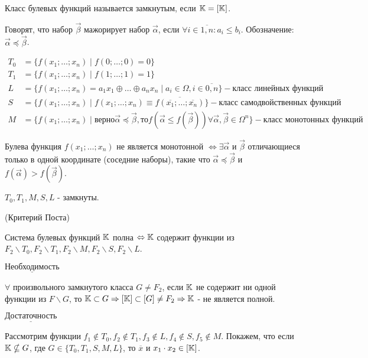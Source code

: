\opr Класс булевых функций называется замкнутым, если $\mathbb{K} = [\mathbb{K}]$.

Говорят, что набор $\vec{\beta}$ мажорирует набор $\vec{\alpha}$, если $\forall i \in \overline{1, n}: a_i \leq b_i$. Обозначение: $\vec{\alpha} \preccurlyeq \vec{\beta}$.

\examplei
\begin{align*}
    T_0 &= \{f(x_1; \dots; x_n) \mid f(0; \dots; 0) = 0\}\\
    T_1 &= \{f(x_1; \dots; x_n) \mid f(1; \dots; 1) = 1\}\\
    L   &= \{f(x_1; \dots; x_n) = a_1x_1 \oplus \ldots \oplus a_nx_n \mid a_i \in \Omega, i \in \overline{0, n}\} - \text{класс линейных функций}\\
    S   &= \{f(x_1; \dots; x_n) \mid f(x_1; \dots; x_n) \equiv \overline{f(\overline{x_1}; \dots; \overline{x_n})} \} - \text{класс самодвойственных функций} \\
    M   &= \{f(x_1; \dots; x_n) \mid \text{верно} \vec{\alpha} \preccurlyeq \vec{\beta}, \text{то} f(\vec{\alpha} \leq f(\vec{\beta})) \forall \vec{\alpha}, \vec{\beta} \in \Omega^n\} - \text{класс монотонных функций}
\end{align*}

\lem Булева функция $f(x_1; \dots; x_n)$ не является монотонной $\Leftrightarrow \exists \vec{\alpha}$ и $\vec{\beta}$ отличающиеся
только в одной координате (соседние наборы), такие что $\vec{\alpha} \preccurlyeq \vec{\beta}$ и $f(\vec{\alpha}) > f(\vec{\beta})$.

\thr $T_0, T_1, M, S, L$ - замкнуты.

\thr (Критерий Поста)

Система булевых функций $\mathbb{K}$ полна $\Leftrightarrow \mathbb{K}$ содержит функции из $F_2 \backslash T_0, F_2 \backslash T_1, F_2 \backslash M, F_2 \backslash S, F_2 \backslash L$.

\proof 

    $\underline{\text{Необходимость}}$

    $\forall$ произвольного замкнутого класса $G \neq F_2$, если $\mathbb{K}$ не содержит ни одной функции из $F \backslash G$, то $\mathbb{K} \subset G \Rightarrow [\mathbb{K}] \subset [G] \neq F_2 \Rightarrow \mathbb{K}$ - не
является полной.

    $\underline{\text{Достаточность}}$

    Рассмотрим функции $f_1 \notin T_0, f_2 \notin T_1, f_3 \notin L, f_4 \notin S, f_5 \notin M$.
    Покажем, что если $\mathbb{K} \nsubseteq G$, где $G \in \{T_0, T_1, S, M, L\}$, то $\overline{x}$ и $x_1\cdot x_2 \in [\mathbb{K}]$.


